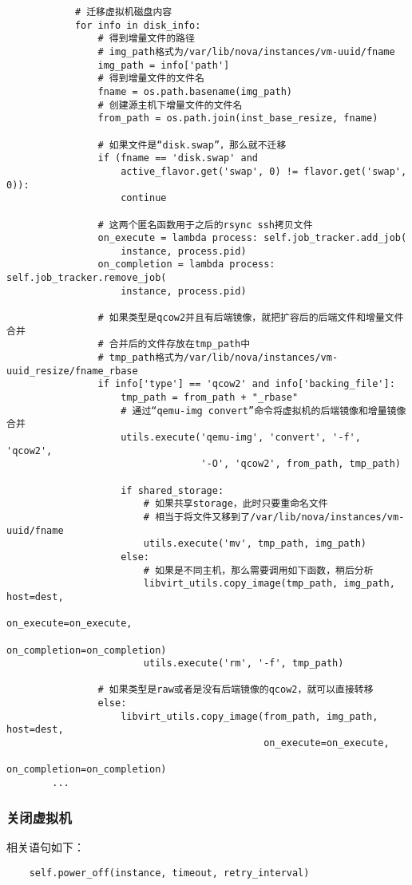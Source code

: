 \documentclass[a4paper,left=1.5cm,right=1.5cm,11pt]{article}
\begin{document}
\begin{lstlisting}
			# 迁移虚拟机磁盘内容
            for info in disk_info:
				# 得到增量文件的路径
				# img_path格式为/var/lib/nova/instances/vm-uuid/fname
                img_path = info['path']
				# 得到增量文件的文件名
                fname = os.path.basename(img_path)
				# 创建源主机下增量文件的文件名
                from_path = os.path.join(inst_base_resize, fname)

				# 如果文件是“disk.swap”，那么就不迁移
                if (fname == 'disk.swap' and
                    active_flavor.get('swap', 0) != flavor.get('swap', 0)):
                    continue
				
				# 这两个匿名函数用于之后的rsync ssh拷贝文件
                on_execute = lambda process: self.job_tracker.add_job(
                    instance, process.pid)
                on_completion = lambda process: self.job_tracker.remove_job(
                    instance, process.pid)

				# 如果类型是qcow2并且有后端镜像，就把扩容后的后端文件和增量文件合并
				# 合并后的文件存放在tmp_path中
				# tmp_path格式为/var/lib/nova/instances/vm-uuid_resize/fname_rbase
                if info['type'] == 'qcow2' and info['backing_file']:
                    tmp_path = from_path + "_rbase"
                    # 通过“qemu-img convert”命令将虚拟机的后端镜像和增量镜像合并
                    utils.execute('qemu-img', 'convert', '-f', 'qcow2',
                                  '-O', 'qcow2', from_path, tmp_path)

                    if shared_storage:
						# 如果共享storage，此时只要重命名文件
						# 相当于将文件又移到了/var/lib/nova/instances/vm-uuid/fname
                        utils.execute('mv', tmp_path, img_path)
                    else:
						# 如果是不同主机，那么需要调用如下函数，稍后分析
                        libvirt_utils.copy_image(tmp_path, img_path, host=dest,
                                                 on_execute=on_execute,
                                                 on_completion=on_completion)
                        utils.execute('rm', '-f', tmp_path)

				# 如果类型是raw或者是没有后端镜像的qcow2，就可以直接转移
                else:
                    libvirt_utils.copy_image(from_path, img_path, host=dest,
                                             on_execute=on_execute,
                                             on_completion=on_completion)
        ...
	\end{lstlisting}

\subsubsection{关闭虚拟机}
	相关语句如下：
	\begin{lstlisting}
	self.power_off(instance, timeout, retry_interval)
	\end{lstlisting}
\end{document}
